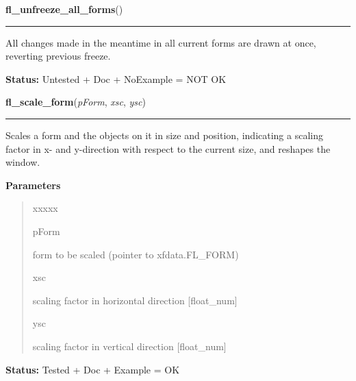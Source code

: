 \hspace{.8\funcindent}\begin{boxedminipage}{\funcwidth}

    \raggedright \textbf{fl\_unfreeze\_all\_forms}()

    \vspace{-1.5ex}

    \rule{\textwidth}{0.5\fboxrule}
\setlength{\parskip}{2ex}
    All changes made in the meantime in all current forms are drawn at 
    once, reverting previous freeze.

\setlength{\parskip}{1ex}
\textbf{Status:} Untested + Doc + NoExample = NOT OK



    \end{boxedminipage}

    \label{xformslib:library:fl_scale_form}

    \vspace{0.5ex}

\hspace{.8\funcindent}\begin{boxedminipage}{\funcwidth}

    \raggedright \textbf{fl\_scale\_form}(\textit{pForm}, \textit{xsc}, \textit{ysc})

    \vspace{-1.5ex}

    \rule{\textwidth}{0.5\fboxrule}
\setlength{\parskip}{2ex}
    Scales a form and the objects on it in size and position, indicating a 
    scaling factor in x- and y-direction with respect to the current size, 
    and reshapes the window.

\setlength{\parskip}{1ex}
      \textbf{Parameters}
      \vspace{-1ex}

      \begin{quote}
        \begin{Ventry}{xxxxx}

          \item[pForm]

          form to be scaled (pointer to xfdata.FL\_FORM)

          \item[xsc]

          scaling factor in horizontal direction [float\_num]

          \item[ysc]

          scaling factor in vertical direction [float\_num]

        \end{Ventry}

      \end{quote}

\textbf{Status:} Tested + Doc + Example = OK



    \end{boxedminipage}

